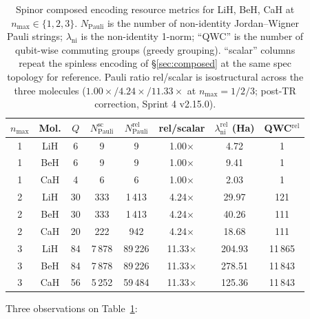 \documentclass[aps,pra,twocolumn,superscriptaddress,longbibliography]{revtex4-2}
\begin{document}
\begin{table}[h]
\caption{Spinor composed encoding resource metrics for LiH, BeH,
CaH at $n_{\max} \in \{1, 2, 3\}$. $N_{\mathrm{Pauli}}$ is the
number of non-identity Jordan--Wigner Pauli strings;
$\lambda_{\mathrm{ni}}$ is the non-identity 1-norm;
``QWC'' is the number of qubit-wise commuting groups (greedy
grouping). ``scalar'' columns repeat the spinless encoding of
\S\ref{sec:composed} at the same spec topology for reference.
Pauli ratio rel/scalar is isostructural across the three molecules
($1.00\times / 4.24\times / 11.33\times$ at $n_{\max}=1/2/3$; post-TR
correction, Sprint 4 v2.15.0).}
\label{tab:spinor_resource}
\begin{ruledtabular}
\begin{tabular}{cccccccc}
$n_{\max}$ & Mol. & $Q$ & $N_{\mathrm{Pauli}}^{\mathrm{sc}}$ & $N_{\mathrm{Pauli}}^{\mathrm{rel}}$ & rel/scalar & $\lambda_{\mathrm{ni}}^{\mathrm{rel}}$ (Ha) & QWC$^{\mathrm{rel}}$ \\
\hline
1 & LiH & 6   & 9        & 9      & 1.00$\times$ & 4.72   & 1 \\
1 & BeH & 6   & 9        & 9      & 1.00$\times$ & 9.41   & 1 \\
1 & CaH & 4   & 6        & 6      & 1.00$\times$ & 2.03   & 1 \\
2 & LiH & 30  & 333      & 1\,413 & 4.24$\times$ & 29.97  & 121 \\
2 & BeH & 30  & 333      & 1\,413 & 4.24$\times$ & 40.26  & 111 \\
2 & CaH & 20  & 222      &    942 & 4.24$\times$ & 18.68  & 111 \\
3 & LiH & 84  & 7\,878   & 89\,226 & 11.33$\times$ & 204.93 & 11\,865 \\
3 & BeH & 84  & 7\,878   & 89\,226 & 11.33$\times$ & 278.51 & 11\,843 \\
3 & CaH & 56  & 5\,252   & 59\,484 & 11.33$\times$ & 125.36 & 11\,843 \\
\end{tabular}
\end{ruledtabular}
\end{table}

Three observations on Table~\ref{tab:spinor_resource}:
\end{document}
